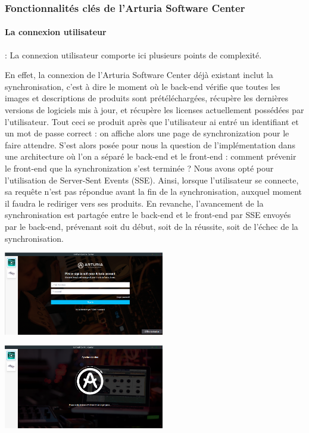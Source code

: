 \documentclass[francais]{rapportPFE}  %
\begin{document}
\subsubsection{Fonctionnalités clés de l'Arturia Software Center}
\paragraph{La connexion utilisateur}: La connexion utilisateur comporte ici plusieurs points de complexité. 

En effet, la connexion de l'Arturia Software Center déjà existant inclut la synchronisation, c'est à dire le moment où le back-end vérifie que toutes les images et descriptions de produits sont prétéléchargées, récupère les dernières versions de logiciels mis à jour, et récupère les licenses actuellement possédées par l'utilisateur. Tout ceci se produit après que l'utilisateur ai entré un identifiant et un mot de passe correct : on affiche alors une page de synchronization pour le faire attendre. S'est alors posée pour nous la question de l'implémentation dans une architecture où l'on a séparé le back-end et le front-end : comment prévenir le front-end que la synchronization s'est terminée ? Nous avons opté pour l'utilisation de Server-Sent Events (SSE). Ainsi, lorsque l'utilisateur se connecte, sa requête n'est pas répondue avant la fin de la synchronisation, auxquel moment il faudra le rediriger vers ses produits. En revanche, l'avancement de la synchronisation est partagée entre le back-end et le front-end par SSE envoyés par le back-end, prévenant soit du début, soit de la réussite, soit de l'échec de la synchronisation.
\begin{center}
    \centering
    \begin{minipage}{.5\textwidth}
    \centering
    \includegraphics[width=7cm]{graphics/disconnected.png}
    \label{fig:test1}
    \end{minipage}%
    \begin{minipage}{.5\textwidth}
    \centering
    \includegraphics[width=7cm]{graphics/sync.png}
    \label{fig:test2}
    \end{minipage}
    \end{center}
\end{document}
